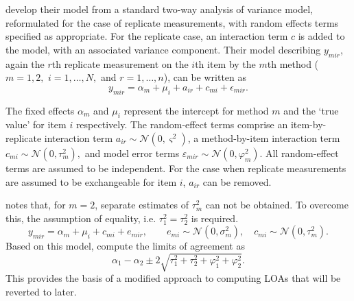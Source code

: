 \documentclass[12pt, a4paper]{report}
\theoremstyle{plain}
\theoremstyle{definition}
\theoremstyle{remark}
\begin{document}

\citet{BXC2008} develop their model from a standard two-way analysis of variance model, reformulated for the case of replicate measurements, with random effects terms specified as appropriate. 
For the replicate case, an interaction term $c$ is added to the model, with an associated variance component. Their model describing $y_{mir} $, again the $r$th replicate measurement on the $i$th item by the $m$th method ($m=1,2,$ $i=1,\ldots,N,$ and $r = 1,\ldots,n$), can be written as
\begin{equation}\label{BXC-model}
y_{mir}  = \alpha_{m} + \mu_{i} + a_{ir} + c_{mi} + \epsilon_{mir}.
\end{equation}

The fixed effects $\alpha_{m}$ and $\mu_{i}$ represent the intercept for method $m$ and the `true value' for item $i$ respectively. The random-effect terms comprise an item-by-replicate interaction term $a_{ir} \sim \mathcal{N}(0,\varsigma^{2})$, a method-by-item interaction term $c_{mi} \sim \mathcal{N}(0,\tau^{2}_{m}),$ and model error terms $\varepsilon_{mir} \sim \mathcal{N}(0,\varphi^{2}_{m}).$ All random-effect terms are assumed to be independent. For the case when replicate measurements are assumed to be exchangeable for item $i$, $a_{ir}$ can be removed. 



\citet{BXC2008} notes that, for $m=2$, separate estimates of $\tau^2_m$ can not be obtained. To overcome this, the assumption of equality, i.e. $\tau^2_1 = \tau^2_2$ is required.
\begin{equation}
y_{mir}  = \alpha_{m} + \mu_{i} + c_{mi} + e_{mir}, \qquad  e_{mi}
\sim \mathcal{N}(0,\sigma^{2}_{m}), \quad c_{mi} \sim \mathcal{N}(0,\tau^{2}_{m}).
\end{equation}
Based on this model, \citet{BXC2008} compute the limits of agreement as
\begin{equation}
\alpha_1 - \alpha_2 \pm 2 \sqrt{ \tau^2_1 +  \tau^2_2 +  \varphi^2_1 +  \varphi^2_2 }.
\end{equation}
This provides the basis of a modified approach to computing LOAs that will be reverted to later.





\end{document}
